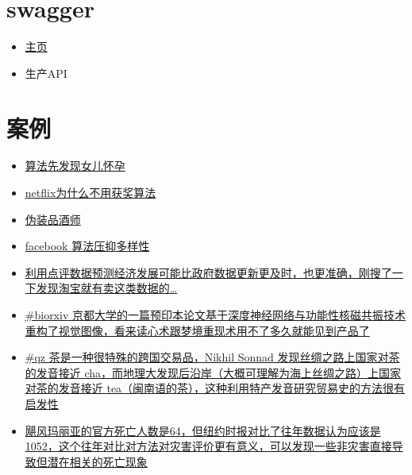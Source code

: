 \documentclass[
]{book}
\providecommand{\tightlist}{%
  \setlength{\itemsep}{0pt}\setlength{\parskip}{0pt}}
\begin{document}
\hypertarget{swagger}{%
\section{swagger}\label{swagger}}

\begin{itemize}
\tightlist
\item
  \href{https://swagger.io/}{主页}
\item
  生产API
\end{itemize}

\hypertarget{ux6848ux4f8b}{%
\section{案例}\label{ux6848ux4f8b}}

\begin{itemize}
\item
  \href{https://www.forbes.com/sites/kashmirhill/2012/02/16/how-target-figured-out-a-teen-girl-was-pregnant-before-her-father-did/\#304228956668}{算法先发现女儿怀孕}
\item
  \href{https://www.techdirt.com/articles/20120409/03412518422/why-netflix-never-implemented-algorithm-that-won-netflix-1-million-challenge.shtml}{netflix为什么不用获奖算法}
\item
  \href{http://www.onthelambda.com/2014/02/20/how-to-fake-a-sophisticated-knowledge-of-wine-with-markov-chains/}{伪装品酒师}
\item
  \href{https://medium.com/message/how-facebook-s-algorithm-suppresses-content-diversity-modestly-how-the-newsfeed-rules-the-clicks-b5f8a4bb7bab}{facebook 算法压抑多样性}
\item
  \href{http://voxeu.org/article/measuring-local-economy-yelp-data}{利用点评数据预测经济发展可能比政府数据更新更及时，也更准确，刚搜了一下发现淘宝就有卖这类数据的\ldots{}}
\item
  \href{https://www.biorxiv.org/content/early/2017/12/30/240317}{\#biorxiv 京都大学的一篇预印本论文基于深度神经网络与功能性核磁共振技术重构了视觉图像，看来读心术跟梦境重现术用不了多久就能见到产品了}
\item
  \href{https://qz.com/1176962/map-how-the-word-tea-spread-over-land-and-sea-to-conquer-the-world/}{\#qz 茶是一种很特殊的跨国交易品，Nikhil Sonnad 发现丝绸之路上国家对茶的发音接近 cha，而地理大发现后沿岸（大概可理解为海上丝绸之路）上国家对茶的发音接近 tea（闽南语的茶），这种利用特产发音研究贸易史的方法很有启发性}
\item
  \href{https://www.nytimes.com/interactive/2017/12/08/us/puerto-rico-hurricane-maria-death-toll.html?_r=0}{飓风玛丽亚的官方死亡人数是64，但纽约时报对比了往年数据认为应该是1052，这个往年对比对方法对灾害评价更有意义，可以发现一些非灾害直接导致但潜在相关的死亡现象}

\end{itemize}
\end{document}
